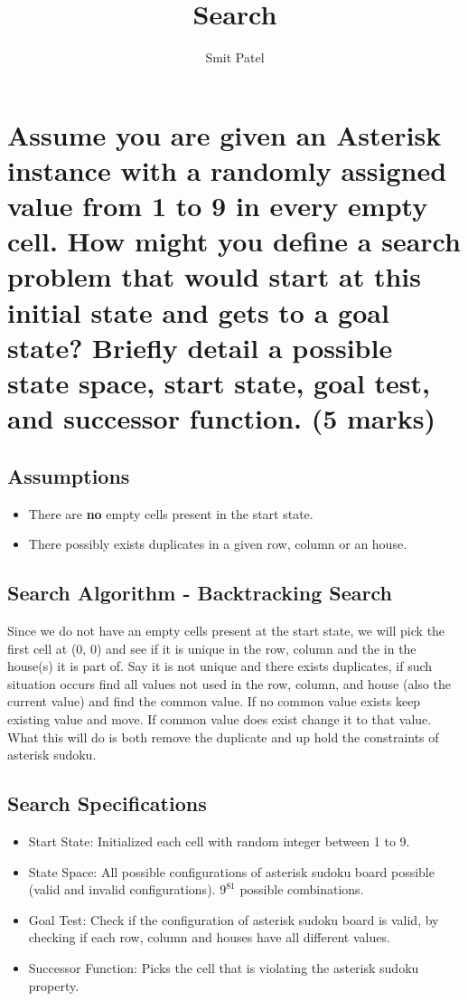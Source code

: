 \documentclass[12pt]{article}
\title{Search}
\author{Smit Patel}
\begin{document}
\maketitle
\newpage
\section{\normalsize{Assume you are given an Asterisk instance with a randomly assigned value from 1 to 9 in every empty
      cell. How might you define a search problem that would start at this initial state and gets to a goal state?
      Briefly detail a possible state space, start state, goal test, and successor function. (5 marks)}}
\subsection{Assumptions}
\begin{itemize}
    \item There are \textbf{no} empty cells present in the start state.
    \item There possibly exists duplicates in a given row, column or an house.
\end{itemize}
\subsection{Search Algorithm - Backtracking Search}
Since we do not have an empty cells present at the start state, we will pick the first cell at (0, 0) and see if it is unique in the row, column and the in the house(s) it is part of. Say it is not unique and there exists duplicates, if such situation occurs find all values not used in the row, column, and house (also the current value) and find the common value. If no common value exists keep existing value and move. If common value does exist change it to that value. What this will do is both remove the duplicate and up hold the constraints of asterisk sudoku.
\subsection{Search Specifications}
\begin{itemize}
    \item Start State: Initialized each cell with random integer between 1 to 9.
    \item State Space: All possible configurations of asterisk sudoku board possible (valid and invalid configurations). $9^{81}$ possible combinations.
    \item Goal Test: Check if the configuration of asterisk sudoku board is valid, by checking if each row, column and houses have all different values.
    \item Successor Function: Picks the cell that is violating the asterisk sudoku property.
\end{itemize}
\end{document}
